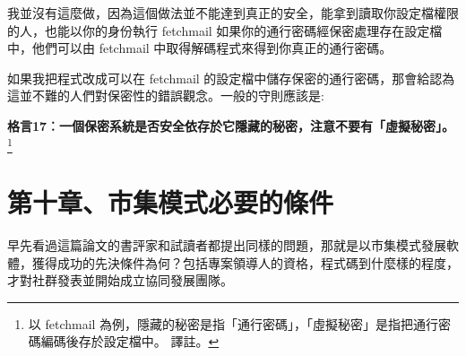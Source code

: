 \documentclass[10pt, b5paper]{book}
\makeatletter
\newcommand*{\shifttext}[2]{%
  \settowidth{\@tempdima}{#2}%
  \makebox[\@tempdima]{\hspace*{#1}#2}%
}
\makeatother
\begin{document}
我並沒有這麼做，因為這個做法並不能達到真正的安全，能拿到讀取你設定檔權限的人，也能以你的身份執行
fetchmail \shifttext{1pt}{---}\shifttext{-1pt}{---} 如果你的通行密碼經保密處理存在設定檔中，他們可以由
fetchmail 中取得解碼程式來得到你真正的通行密碼。

如果我把程式改成可以在 fetchmail
的設定檔中儲存保密的通行密碼，那會給認為這並不難的人們對保密性的錯誤觀念。一般的守則應該是:

\textbf{格言17︰一個保密系統是否安全依存於它隱藏的秘密，注意不要有「虛擬秘密」。}\footnote{以
  fetchmail
  為例，隱藏的秘密是指「通行密碼」，「虛擬秘密」是指把通行密碼編碼後存於設定檔中。
  \shifttext{1pt}{---}\shifttext{-1pt}{---} 譯註。}

\newpage
\section{第十章、市集模式必要的條件}

早先看過這篇論文的書評家和試讀者都提出同樣的問題，那就是以市集模式發展軟體，獲得成功的先決條件為何？包括專案領導人的資格，程式碼到什麼樣的程度，才對社群發表並開始成立協同發展團隊。
\end{document}
